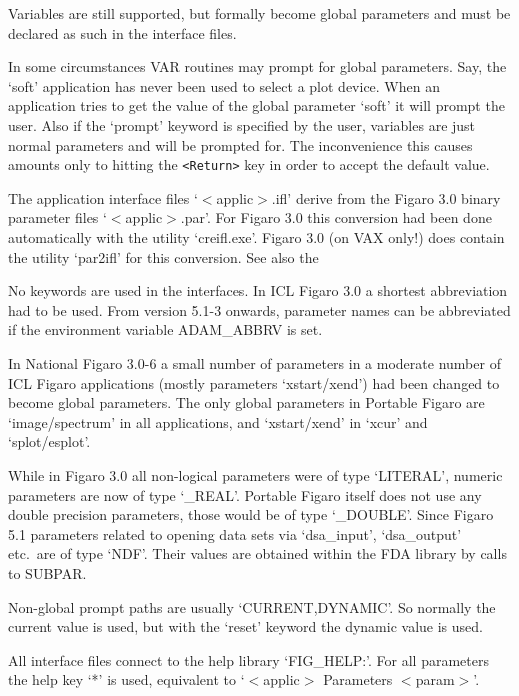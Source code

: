    Variables are still supported, but formally become global parameters
   and must be declared as such in the interface files.

   In some circumstances VAR routines may prompt for global parameters.
   Say, the `soft' application has never been used to select a plot
   device. When an application tries to get the value of the global
   parameter `soft' it will prompt the user. Also if the `prompt'
   keyword is specified by the user, variables are just normal
   parameters and will be prompted for. The inconvenience this causes
   amounts only to hitting the \texttt{<Return>} key in order to accept the
   default value.

   The application interface files `$<$applic$>$.ifl' derive from the Figaro
   3.0 binary parameter files `$<$applic$>$.par'. For Figaro 3.0 this
   conversion had been done automatically with the utility `creifl.exe'.
   Figaro 3.0 (on VAX only!) does contain the utility `par2ifl' for this
   conversion.  See also
   {the }

   No keywords are used in the interfaces.
   In ICL Figaro 3.0 a shortest abbreviation had to be used. From version
   5.1-3 onwards, parameter names can be abbreviated if the environment
   variable ADAM\_ABBRV is set.

   In National Figaro 3.0-6 a small number of parameters in a moderate
   number of ICL Figaro applications (mostly parameters `xstart/xend')
   had been changed to become global parameters. The only global
   parameters in Portable Figaro are `image/spectrum' in all
   applications, and `xstart/xend' in `xcur' and `splot/esplot'.

   While in Figaro 3.0 all non-logical parameters were of type
   `LITERAL', numeric parameters are now of type `\_REAL'. Portable
   Figaro itself does not use any double precision parameters, those
   would be of type `\_DOUBLE'. Since Figaro 5.1 parameters related to
   opening data sets via `dsa\_input', `dsa\_output' etc.\ are of type
   `NDF'. Their values are obtained within the FDA library by calls to
   SUBPAR.

   Non-global prompt paths are usually `CURRENT,DYNAMIC'. So normally
   the current value is used, but with the `reset' keyword the dynamic
   value is used.

   All interface files connect to the help library `FIG\_HELP:'. For
   all parameters the help key `*' is used, equivalent to `$<$applic$>$
   Parameters $<$param$>$'.

